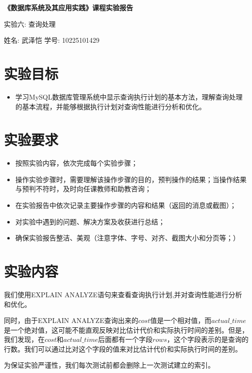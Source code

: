 \documentclass{article}
\begin{document}
\begin{center}
    \textbf{\LARGE{《数据库系统及其应用实践》课程实验报告}}

    \large{实验六: 查询处理 }

    \large{姓名: 武泽恺 \quad 学号: 10225101429}

\end{center}

\section{实验目标}
\begin{itemize}
    \item 学习MySQL数据库管理系统中显示查询执行计划的基本方法，理解查询处理的基本流程，并能够根据执行计划对查询性能进行分析和优化。
\end{itemize}

\section{实验要求}

\begin{itemize}
    \item 按照实验内容，依次完成每个实验步骤；
    \item 操作实验步骤时，需要理解该操作步骤的目的，预判操作的结果；当操作结果与预判不符时，及时向任课教师和助教咨询；
    \item 在实验报告中依次记录主要操作步骤的内容和结果（返回的消息或截图）；
    \item 对实验中遇到的问题、解决方案及收获进行总结；
    \item 确保实验报告整洁、美观（注意字体、字号、对齐、截图大小和分页等；）
\end{itemize}

\section{实验内容}

我们使用EXPLAIN ANALYZE语句来查看查询执行计划,并对查询性能进行分析和优化。

同时，由于EXPLAIN ANALYZE查询出来的$cost$值是一个相对值，而$actual\_time$是一个绝对值，这可能不能直观反映对比估计代价和实际执行时间的差别。但是，我们发现，在$cost$和$actual\_time$后面都有一个字段$rows$，这个字段表示的是查询的行数。我们可以通过比对这个字段的值来对比估计代价和实际执行时间的差别。

为保证实验严谨性，我们每次测试前都会删除上一次测试建立的索引。
\end{document}
